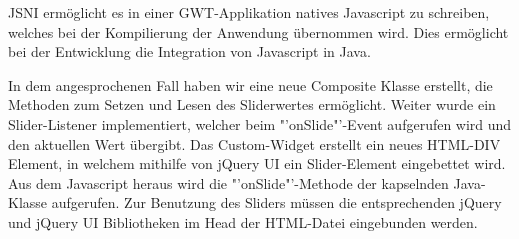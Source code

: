 JSNI ermöglicht es in einer GWT-Applikation natives Javascript zu schreiben, welches bei der Kompilierung der Anwendung übernommen wird. Dies ermöglicht bei der Entwicklung die Integration von Javascript in Java.

In dem angesprochenen Fall haben wir eine neue Composite Klasse erstellt, die Methoden zum Setzen und Lesen des Sliderwertes ermöglicht. Weiter wurde ein Slider-Listener implementiert, welcher beim "'onSlide"'-Event aufgerufen wird und den aktuellen Wert übergibt. Das Custom-Widget erstellt ein neues HTML-DIV Element, in welchem mithilfe von jQuery UI ein Slider-Element eingebettet wird. Aus dem Javascript heraus wird die "'onSlide"'-Methode der kapselnden Java-Klasse aufgerufen. Zur Benutzung des Sliders müssen die entsprechenden jQuery und jQuery UI Bibliotheken im Head der HTML-Datei eingebunden werden.
